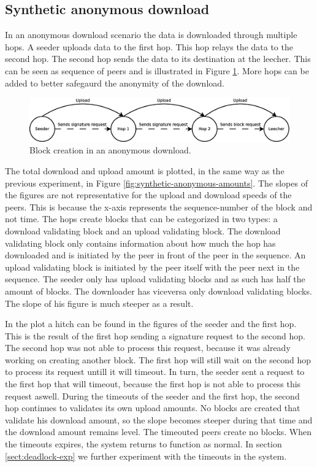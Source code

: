 \subsection{Synthetic anonymous download}
In an anonymous download scenario the data is downloaded through multiple hops.
A seeder uploads data to the first hop.
This hop relays the data to the second hop.
The second hop sends the data to its destination at the leecher.
This can be seen as sequence of peers and is illustrated in Figure \ref{fig:seeder-hops-leecher}.
More hops can be added to better safegaurd the anonymity of the download.

\begin{figure}
	\centerline{\includegraphics[scale=0.3]{experimentation/anonymous/seeder-hops-leecher.eps}}
	\caption{Block creation in an anonymous download.}
	\label{fig:seeder-hops-leecher}
\end{figure}

The total download and upload amount is plotted, in the same way as the previous experiment,
in Figure \ref{fig:synthetic-anonymous-amounts}.
The slopes of the figures are not representative for the upload and download speeds of the peers.
This is because the x-axis represents the sequence-number of the block and not time.
The hops create blocks that can be categorized in two types:
a download validating block and an upload validating block.
The download validating block only contains information about how much the hop has downloaded
and is initiated by the peer in front of the peer in the sequence.
An upload validating block is initiated by the peer itself with the peer next in the sequence.
The seeder only has upload validating blocks and as such has half the amount of blocks.
The downloader has viceversa only download validating blocks.
The slope of his figure is much steeper as a result.

In the plot a hitch can be found in the figures of the seeder and the first hop.
This is the result of the first hop sending a signature request to the second hop.
The second hop was not able to process this request,
because it was already working on creating another block.
The first hop will still wait on the second hop to process its request untill it will timeout.
In turn, the seeder sent a request to the first hop that will timeout,
because the first hop is not able to process this request aswell.
During the timeouts of the seeder and the first hop,
the second hop continues to validates its own upload amounts.
No blocks are created that validate his download amount,
so the slope becomes steeper during that time and the download amount remains level.
The timeouted peers create no blocks.
When the timeouts expires, the system returns to function as normal.
In section \ref{sect:deadlock-exp} we further experiment with the timeouts in the system.

